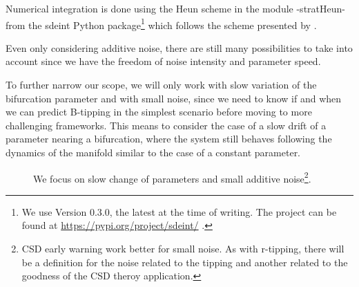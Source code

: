 Numerical integration is done using  the Heun scheme in the module -stratHeun- from the sdeint Python package\footnote{We use Version 0.3.0, the latest at the time of writing. The project can be found at \href{https://pypi.org/project/sdeint/}{https://pypi.org/project/sdeint/} .} which follows the scheme presented by \cite{Mannella2002,Burrage}.



Even only considering additive noise, there are still many possibilities to take into account since we have the freedom of noise intensity and parameter speed. 

To further narrow our scope, we will only work with slow variation of the bifurcation parameter and with small noise, since we need to know if and when we can predict B-tipping in the simplest scenario before moving to more challenging frameworks. 
This means to consider the case of a slow drift of a parameter nearing a bifurcation, where the system still behaves following the dynamics of the manifold  similar to the case of a constant parameter. 

\begin{figure}[htb]
	\centering
	\caption{We focus on slow change of parameters and small additive noise\footnote{CSD early warning work better for small noise. As with r-tipping, there will be a definition for the noise related to the tipping and another related to the goodness of the CSD theroy application.}.}        
	\label{fig: noise_transition}
\end{figure}
 
